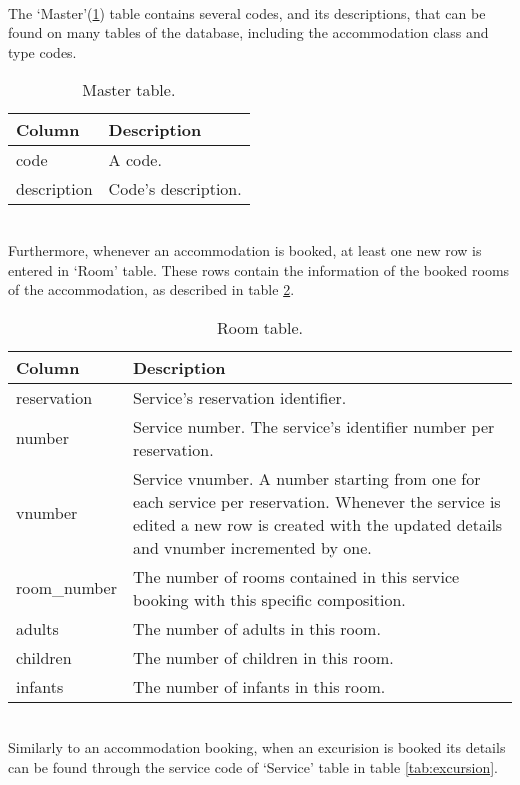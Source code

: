 \\
The `Master'(\ref{tab:master}) table contains several codes, and its descriptions, that can be found on many tables of the database, including the accommodation class and type codes.
\begin{table}[!htb]
\begin{center}
\begin{tabular}{l | p{12cm}}
\textcolor{theme}{\textbf{Column}} & \textcolor{theme}{\textbf{Description}}\\
\hline
code & A code.\\
\hline
description & Code's description.\\
\hline
\end{tabular}
\caption{Master table.}
\label{tab:master}
\end{center}
\end{table}
\\
Furthermore, whenever an accommodation is booked, at least one new row is entered in `Room' table. These rows contain the information of the booked rooms of the accommodation, as described in table \ref{tab:room}.
\begin{table}[ht]
\begin{center}
\begin{tabular}{l | p{12cm}}
\textcolor{theme}{\textbf{Column}} & \textcolor{theme}{\textbf{Description}}\\
\hline
reservation & Service's reservation identifier.\\
\hline
number & Service number. The service's identifier number per reservation.\\
\hline
vnumber & Service vnumber. A number starting from one for each service per reservation. Whenever the service is edited a new row is created with the updated details and vnumber incremented by one.\\
\hline
room\_number & The number of rooms contained in this service booking with this specific composition.\\
\hline
adults & The number of adults in this room.\\
\hline
children & The number of children in this room.\\
\hline
infants & The number of infants in this room.\\
\hline
\end{tabular}
\caption{Room table.}
\label{tab:room}
\end{center}
\end{table}
\\
Similarly to an accommodation booking, when an excurision is booked its details can be found through the service code of `Service' table in table \ref{tab:excursion}.
